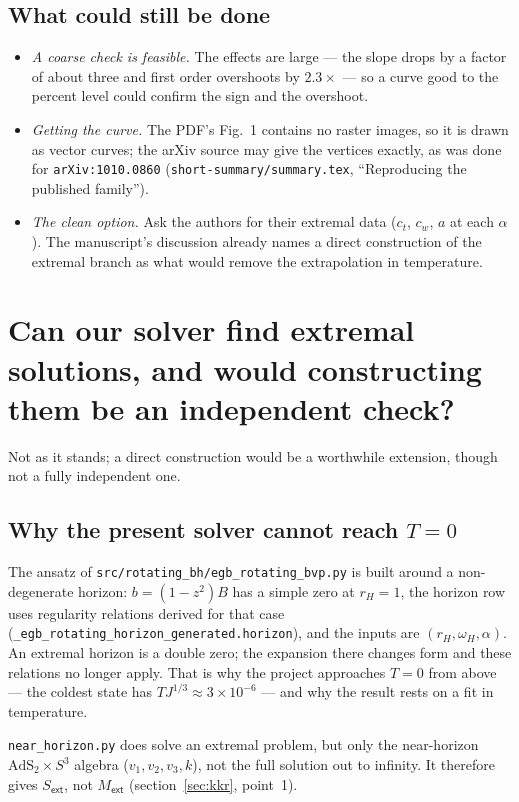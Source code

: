 \documentclass[11pt,a4paper]{article}
\newcommand{\q}[1]{\subsection*{\color{accent}#1}}
\newcommand{\ext}{\mathsf{ext}}
\begin{document}
\q{What could still be done}

\begin{itemize}\itemsep3pt
  \item \emph{A coarse check is feasible.} The effects are large --- the slope
  drops by a factor of about three and first order overshoots by $2.3\times$ ---
  so a curve good to the percent level could confirm the sign and the overshoot.
  \item \emph{Getting the curve.} The PDF's Fig.~1 contains no raster images, so
  it is drawn as vector curves; the arXiv source may give the vertices exactly,
  as was done for \texttt{arXiv:1010.0860} (\texttt{short-summary/summary.tex},
  ``Reproducing the published family'').
  \item \emph{The clean option.} Ask the authors for their extremal data
  ($c_t$, $c_w$, $a$ at each $\alpha$). The manuscript's discussion already names
  a direct construction of the extremal branch as what would remove the
  extrapolation in temperature.
\end{itemize}

\section{Can our solver find extremal solutions, and would constructing them
be an independent check?}
\label{sec:direct}

\noindent Not as it stands; a direct construction would be a worthwhile
extension, though not a fully independent one.

\q{Why the present solver cannot reach $T=0$}

The ansatz of \texttt{src/rotating\_bh/egb\_rotating\_bvp.py} is built around a
non-degenerate horizon: $b=(1-z^2)B$ has a simple zero at $r_H=1$, the horizon row
uses regularity relations derived for that case
(\texttt{\_egb\_rotating\_horizon\_generated.horizon}), and the inputs are
$(r_H,\omega_H,\alpha)$. An extremal horizon is a double zero; the expansion there
changes form and these relations no longer apply. That is why the project
approaches $T=0$ from above --- the coldest state has
$TJ^{1/3}\approx3\times10^{-6}$ --- and why the result rests on a fit in
temperature.

\texttt{near\_horizon.py} does solve an extremal problem, but only the
near-horizon $\mathrm{AdS}_2\times S^3$ algebra ($v_1,v_2,v_3,k$), not the full
solution out to infinity. It therefore gives $S_\ext$, not $M_\ext$
(section~\ref{sec:kkr}, point~1).
\end{document}
